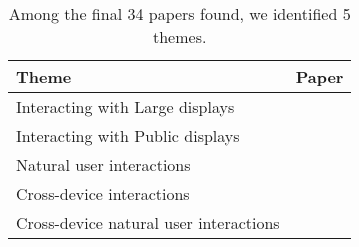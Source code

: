 \begin{table}[h!]
\centering
\begin{tabular}{@{}lp{3cm}@{}}
\toprule
Theme & Paper \\\midrule[2pt] 
Interacting with Large displays      & \cite{Weiser:1991} \cite{Hinrichs:2013:IPD:2478559.2478965} \cite{Wellner:1993} \cite{Buxton:2000} \\\midrule%
Interacting with Public displays      & \cite{Brignull:2003} \cite{Ojala:2012:MIP:2225044.2225065} \cite{Schieck:2012:AEM:2393132.2393141} \cite{Boring:2013} \cite{Jacucci:2010} \cite{Ren:2013} \cite{Lucero:2012} \cite{Valkanova:2014} \cite{Huang:2003} \\\midrule%
Natural user interactions      & \cite{Keefe:2001} \cite{Vogel:2005} \cite{Aigner:2012} \cite{Karam:2005} \cite{Walter:2014} \cite{Wigdor:2011} \cite{Wilson:2010} \cite{KinectFiction:2010} \cite{KinnectPower:2012} \\\midrule%
Cross-device interactions      & \cite{Scharf:2013} \cite{Rekimoto:1997} \cite{Hamilton:2014} \cite{Radle:2015} \cite{Schmidt:2012} \cite{Boring:2009} \\\midrule%
Cross-device natural user interactions      & \cite{Marquardt:2011} \cite{Marquardt:2012} \cite{Seifert:2012} \cite{Bragton:2011} \\%
\bottomrule
\end{tabular}
\caption{Among the final 34 papers found, we identified 5 themes.}
\label{tab:themes}
\end{table}






